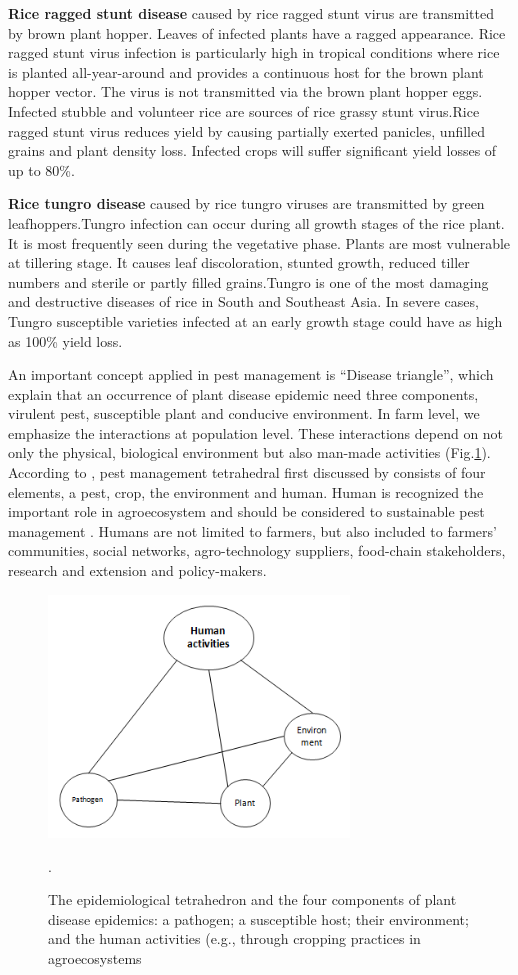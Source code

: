 \textbf{Rice ragged stunt disease} caused by rice ragged stunt virus are transmitted by brown plant hopper. Leaves of infected plants have a ragged appearance. Rice ragged stunt virus infection is particularly high in tropical conditions where rice is planted all-year-around and provides a continuous host for the brown plant hopper vector. The virus is not transmitted via the brown plant hopper eggs. Infected stubble and volunteer rice are sources of rice grassy stunt virus.Rice ragged stunt virus reduces yield by causing partially exerted panicles, unfilled grains and plant density loss. Infected crops will suffer significant yield losses of up to 80\%.

\textbf{Rice tungro disease} caused by rice tungro viruses are transmitted by green leafhoppers.Tungro infection can occur during all growth stages of the rice plant. It is most frequently seen during the vegetative phase. Plants are most vulnerable at tillering stage. It causes leaf discoloration, stunted growth, reduced tiller numbers and sterile or partly filled grains.Tungro is one of the most damaging and destructive diseases of rice in South and Southeast Asia. In severe cases, Tungro susceptible varieties infected at an early growth stage could have as high as 100\% yield loss.

An important concept applied in pest management is ``Disease triangle'', which explain that an occurrence of plant disease epidemic need three components, virulent pest, susceptible plant and conducive environment. In farm level, we emphasize the interactions at population level. These interactions depend on not only the physical, biological environment but also man-made activities (Fig.\ref{fig:diseasetriangle}). According to \citet{Savary:2006to}, pest management tetrahedral first discussed by \cite{Zadoks:1979ts} consists of four elements, a pest, crop, the environment and human. Human is recognized the important role in agroecosystem and should be considered to sustainable pest management \citep{Zadok1985}. Humans are not limited to farmers, but also included to farmers’ communities, social networks, agro-technology suppliers,  food-chain  stakeholders,  research  and extension and policy-makers.

\begin{figure}
\includegraphics[width=8cm]{distriangle}
\centering
\caption{The epidemiological tetrahedron and the four components of plant disease epidemics: a pathogen; a susceptible host; their environment; and the human activities (e.g., through cropping practices in agroecosystems}.
\label{fig:diseasetriangle}
\end{figure}


